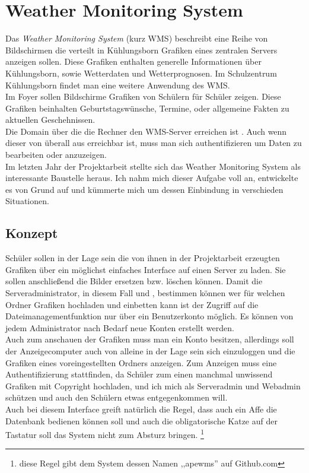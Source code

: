 \section{Weather Monitoring System}
Das \textit{Weather Monitoring System} (kurz WMS) beschreibt eine Reihe von Bildschirmen die verteilt in Kühlungsborn Grafiken eines zentralen Servers anzeigen sollen.
Diese Grafiken enthalten generelle Informationen über Kühlungsborn,
sowie Wetterdaten und Wetterprognosen.
Im Schulzentrum Kühlungsborn findet man eine weitere Anwendung des WMS. \\
Im Foyer sollen Bildschirme Grafiken von Schülern für Schüler zeigen.
Diese Grafiken beinhalten Geburtstagswünsche, Termine, oder allgemeine Fakten zu aktuellen Geschehnissen. \\
Die Domain über die die Rechner den WMS-Server erreichen ist .
Auch wenn dieser von überall aus erreichbar ist,
muss man sich authentifizieren um Daten zu bearbeiten oder anzuzeigen.\\
Im letzten Jahr der Projektarbeit stellte sich das Weather Monitoring System als
interessante Baustelle heraus. Ich nahm mich dieser Aufgabe voll an, entwickelte
es von Grund auf und kümmerte mich um dessen Einbindung in verschieden Situationen.

\subsection{Konzept} %
Schüler sollen in der Lage sein die von ihnen in der Projektarbeit erzeugten Grafiken über ein möglichst einfaches Interface auf einen Server zu laden.
Sie sollen anschließend die Bilder ersetzen bzw. löschen können.
Damit die Serveradministrator, in diesem Fall \mb und \re ,
bestimmen können wer für welchen Ordner Grafiken hochladen und einbetten kann ist der Zugriff auf die Dateimanagementfunktion nur über ein Benutzerkonto möglich.
Es können von jedem Administrator nach Bedarf neue Konten erstellt werden. \\
Auch zum anschauen der Grafiken muss man ein Konto besitzen,
allerdings soll der Anzeigecomputer auch von alleine in der Lage sein sich einzuloggen und die Grafiken eines voreingestellten Ordners anzeigen.
Zum Anzeigen muss eine Authentifizierung stattfinden, da Schüler zum einen manchmal unwissend Grafiken mit Copyright hochladen,
und ich mich als Serveradmin und Webadmin schützen und auch den
Schülern etwas entgegenkommen will. \\
Auch bei diesem Interface greift natürlich die Regel,
dass auch ein Affe die Datenbank bedienen können soll
und auch die obligatorische Katze auf der Tastatur soll das
System nicht zum Absturz bringen. \footnote{diese Regel gibt dem System
dessen Namen ,,apewms'' auf Github.com}

